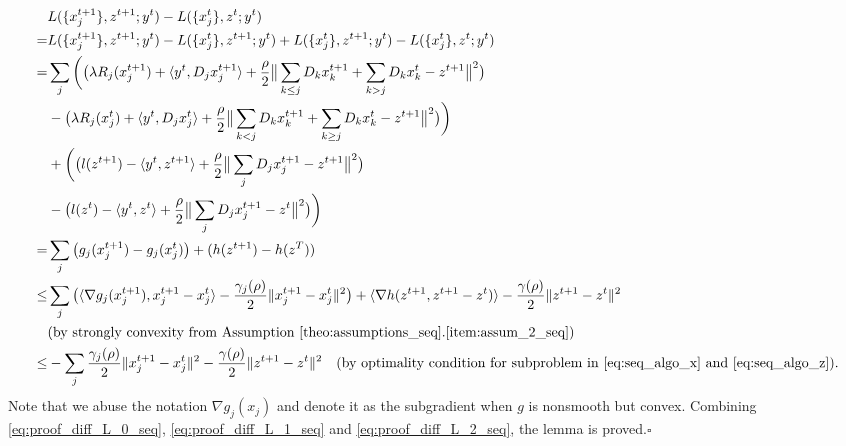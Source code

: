 \begin{align}
    & L(\{x_j^{t+1}\},z^{t+1};y^{t}) - L(\{x_j^{t}\},z^{t};y^{t})\nonumber\\
    = & L(\{x_j^{t+1}\},z^{t+1};y^{t}) - L(\{x_j^{t}\},z^{t+1};y^{t}) + L(\{x_j^{t}\},z^{t+1};y^{t}) - L(\{x_j^{t}\},z^{t};y^{t})\nonumber\\
    = & \sum_j\bigg(\big(\lambda R_j(x_j^{t+1}) + \langle y^t, D_jx_j^{t+1}\rangle + \frac{\rho}{2}\big\|\sum_{k\le j}D_kx_k^{t+1} + \sum_{k>j}D_kx_k^t - z^{t+1}\big\|^2\big)\nonumber\\
    & - \big(\lambda R_j(x_j^{t}) + \langle y^t, D_jx_j^{t}\rangle + \frac{\rho}{2}\big\|\sum_{k< j}D_kx_k^{t+1} + \sum_{k\ge j}D_kx_k^t - z^{t+1}\big\|^2\big)\bigg)\nonumber\\
    & + \bigg(\big(l(z^{t+1}) -\langle y^t, z^{t+1}\rangle + \frac{\rho}{2} \big\|\sum_jD_jx_j^{t+1} - z^{t+1}\big\|^2\big)\nonumber\\
    & -\big(l(z^{t}) -\langle y^t, z^{t}\rangle+ \frac{\rho}{2} \big\|\sum_jD_jx_j^{t+1} - z^{t}\big\|^2\big)\bigg)\\
    = & \sum_j\big(g_j(x_j^{t+1}) - g_j(x_j^t)\big) + (h(z^{t+1}) - h(z^T))\nonumber\\
    \le & \sum_j \big(\langle \nabla g_j(x_j^{t+1}), x_j^{t+1}-x_j^t\rangle - \frac{\gamma_j(\rho)}{2}\|x_j^{t+1}-x_j^t\|^2\big) + \langle\nabla h(z^{t+1}, z^{t+1} - z^t)\rangle - \frac{\gamma(\rho)}{2}\|z^{t+1} - z^t\|^2\nonumber\\
    & \text{(by strongly convexity from Assumption~\ref{theo:assumptions_seq}.\ref{item:assum_2_seq})}\nonumber\\
    \le & -\sum_j\frac{\gamma_j(\rho)}{2}\|x_j^{t+1}-x_j^t\|^2 - \frac{\gamma(\rho)}{2}\|z^{t+1} - z^t\|^2\quad\text{(by optimality condition for subproblem in \eqref{eq:seq_algo_x} and \eqref{eq:seq_algo_z})}.\label{eq:proof_diff_L_2_seq}
\end{align}
Note that we abuse the notation $\nabla g_j(x_j)$ and denote it as the subgradient when $g$ is nonsmooth but convex. 
Combining \eqref{eq:proof_diff_L_0_seq}, \eqref{eq:proof_diff_L_1_seq} and \eqref{eq:proof_diff_L_2_seq}, the lemma is proved.\hfill$\square$

